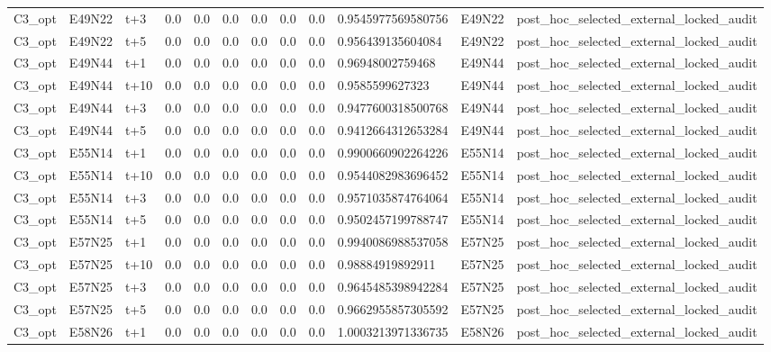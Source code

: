 \begin{landscape}
\begin{longtable}{llllllllllll}
C3\_opt & E49N22 & t+3 & 0.0 & 0.0 & 0.0 & 0.0 & 0.0 & 0.0 & 0.9545977569580756 & E49N22 & post\_hoc\_selected\_external\_locked\_audit \\
C3\_opt & E49N22 & t+5 & 0.0 & 0.0 & 0.0 & 0.0 & 0.0 & 0.0 & 0.956439135604084 & E49N22 & post\_hoc\_selected\_external\_locked\_audit \\
C3\_opt & E49N44 & t+1 & 0.0 & 0.0 & 0.0 & 0.0 & 0.0 & 0.0 & 0.96948002759468 & E49N44 & post\_hoc\_selected\_external\_locked\_audit \\
C3\_opt & E49N44 & t+10 & 0.0 & 0.0 & 0.0 & 0.0 & 0.0 & 0.0 & 0.9585599627323 & E49N44 & post\_hoc\_selected\_external\_locked\_audit \\
C3\_opt & E49N44 & t+3 & 0.0 & 0.0 & 0.0 & 0.0 & 0.0 & 0.0 & 0.9477600318500768 & E49N44 & post\_hoc\_selected\_external\_locked\_audit \\
C3\_opt & E49N44 & t+5 & 0.0 & 0.0 & 0.0 & 0.0 & 0.0 & 0.0 & 0.9412664312653284 & E49N44 & post\_hoc\_selected\_external\_locked\_audit \\
C3\_opt & E55N14 & t+1 & 0.0 & 0.0 & 0.0 & 0.0 & 0.0 & 0.0 & 0.9900660902264226 & E55N14 & post\_hoc\_selected\_external\_locked\_audit \\
C3\_opt & E55N14 & t+10 & 0.0 & 0.0 & 0.0 & 0.0 & 0.0 & 0.0 & 0.9544082983696452 & E55N14 & post\_hoc\_selected\_external\_locked\_audit \\
C3\_opt & E55N14 & t+3 & 0.0 & 0.0 & 0.0 & 0.0 & 0.0 & 0.0 & 0.9571035874764064 & E55N14 & post\_hoc\_selected\_external\_locked\_audit \\
C3\_opt & E55N14 & t+5 & 0.0 & 0.0 & 0.0 & 0.0 & 0.0 & 0.0 & 0.9502457199788747 & E55N14 & post\_hoc\_selected\_external\_locked\_audit \\
C3\_opt & E57N25 & t+1 & 0.0 & 0.0 & 0.0 & 0.0 & 0.0 & 0.0 & 0.9940086988537058 & E57N25 & post\_hoc\_selected\_external\_locked\_audit \\
C3\_opt & E57N25 & t+10 & 0.0 & 0.0 & 0.0 & 0.0 & 0.0 & 0.0 & 0.98884919892911 & E57N25 & post\_hoc\_selected\_external\_locked\_audit \\
C3\_opt & E57N25 & t+3 & 0.0 & 0.0 & 0.0 & 0.0 & 0.0 & 0.0 & 0.9645485398942284 & E57N25 & post\_hoc\_selected\_external\_locked\_audit \\
C3\_opt & E57N25 & t+5 & 0.0 & 0.0 & 0.0 & 0.0 & 0.0 & 0.0 & 0.9662955857305592 & E57N25 & post\_hoc\_selected\_external\_locked\_audit \\
C3\_opt & E58N26 & t+1 & 0.0 & 0.0 & 0.0 & 0.0 & 0.0 & 0.0 & 1.0003213971336735 & E58N26 & post\_hoc\_selected\_external\_locked\_audit \\

\end{longtable}
\end{landscape}
